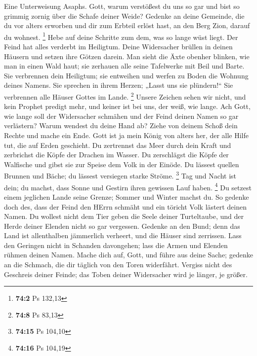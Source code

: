  Eine Unterweisung Asaphs. Gott, warum verstößest du uns
so gar und bist so grimmig zornig über die Schafe deiner Weide?
 Gedenke an deine Gemeinde, die du vor alters erworben und
dir zum Erbteil erlöst hast, an den Berg Zion, darauf du wohnest.
\footnote{\textbf{74:2} Ps 132,13}  Hebe auf deine
Schritte zum dem, was so lange wüst liegt. Der Feind hat alles verderbt
im Heiligtum.  Deine Widersacher brüllen in deinen Häusern
und setzen ihre Götzen darein.  Man sieht die Äxte obenher
blinken, wie man in einen Wald haut;  sie zerhauen alle
seine Tafelwerke mit Beil und Barte.  Sie verbrennen dein
Heiligtum; sie entweihen und werfen zu Boden die Wohnung deines Namens.
 Sie sprechen in ihrem Herzen; „Lasst uns sie
plündern!{}`` Sie verbrennen alle Häuser Gottes im Lande. \footnote{\textbf{74:8}
  Ps 83,13}  Unsere Zeichen sehen wir nicht, und kein
Prophet predigt mehr, und keiner ist bei uns, der weiß, wie lange.
 Ach Gott, wie lange soll der Widersacher schmähen und
der Feind deinen Namen so gar verlästern?  Warum wendest
du deine Hand ab? Ziehe von deinem Schoß dein Rechte und mache ein Ende.
 Gott ist ja mein König von alters her, der alle Hilfe
tut, die auf Erden geschieht.  Du zertrennst das Meer
durch dein Kraft und zerbrichst die Köpfe der Drachen im Wasser.
 Du zerschlägst die Köpfe der Walfische und gibst sie zur
Speise dem Volk in der Einöde.  Du lässest quellen
Brunnen und Bäche; du lässest versiegen starke Ströme. \footnote{\textbf{74:15}
  Ps 104,10}  Tag und Nacht ist dein; du machst, dass
Sonne und Gestirn ihren gewissen Lauf haben. \footnote{\textbf{74:16} Ps
  104,19}  Du setzest einem jeglichen Lande seine Grenze;
Sommer und Winter machst du.  So gedenke doch des, dass
der Feind den HErrn schmäht und ein töricht Volk lästert deinen Namen.
 Du wollest nicht dem Tier geben die Seele deiner
Turteltaube, und der Herde deiner Elenden nicht so gar vergessen.
 Gedenke an den Bund; denn das Land ist allenthalben
jämmerlich verheert, und die Häuser sind zerrissen.  Lass
den Geringen nicht in Schanden davongehen; lass die Armen und Elenden
rühmen deinen Namen.  Mache dich auf, Gott, und führe aus
deine Sache; gedenke an die Schmach, die dir täglich von den Toren
widerfährt.  Vergiss nicht des Geschreis deiner Feinde;
das Toben deiner Widersacher wird je länger, je größer.

